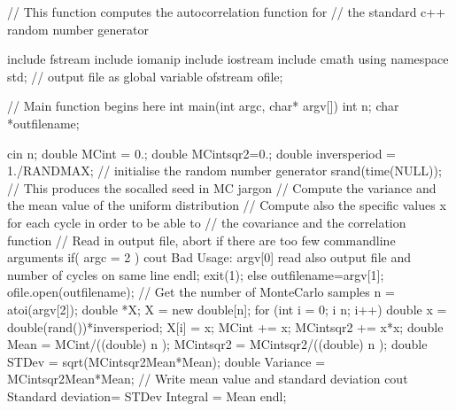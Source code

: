 \documentclass[letterpaper,10pt,english]{sphinxmanual}
\begin{document}
\begin{sphinxVerbatim}[commandchars=\\\{\}]
    //  This function computes the autocorrelation function for 
    //  the standard c++ random number generator
    
    \PYGZsh{}include \PYGZlt{}fstream\PYGZgt{}
    \PYGZsh{}include \PYGZlt{}iomanip\PYGZgt{}
    \PYGZsh{}include \PYGZlt{}iostream\PYGZgt{}
    \PYGZsh{}include \PYGZlt{}cmath\PYGZgt{}
    using namespace std;
    // output file as global variable
    ofstream ofile;  
    
    //     Main function begins here     
    int main(int argc, char* argv[])
    \PYGZob{}
         int n;
         char *outfilename;
    
         cin \PYGZgt{}\PYGZgt{} n;
         double MCint = 0.;      double MCintsqr2=0.;
         double invers\PYGZus{}period = 1./RAND\PYGZus{}MAX; // initialise the random number generator
         srand(time(NULL));  // This produces the so\PYGZhy{}called seed in MC jargon
         // Compute the variance and the mean value of the uniform distribution
         // Compute also the specific values x for each cycle in order to be able to
         // the covariance and the correlation function  
         // Read in output file, abort if there are too few command\PYGZhy{}line arguments
         if( argc \PYGZlt{}= 2 )\PYGZob{}
           cout \PYGZlt{}\PYGZlt{} \PYGZdq{}Bad Usage: \PYGZdq{} \PYGZlt{}\PYGZlt{} argv[0] \PYGZlt{}\PYGZlt{} 
    	 \PYGZdq{} read also output file and number of cycles on same line\PYGZdq{} \PYGZlt{}\PYGZlt{} endl;
           exit(1);
         \PYGZcb{}
         else\PYGZob{}
           outfilename=argv[1];
         \PYGZcb{}
         ofile.open(outfilename); 
         // Get  the number of Monte\PYGZhy{}Carlo samples
         n = atoi(argv[2]);
         double *X;  
         X = new double[n];
         for (int i = 0;  i \PYGZlt{} n; i++)\PYGZob{}
               double x = double(rand())*invers\PYGZus{}period; 
               X[i] = x;
               MCint += x;
               MCintsqr2 += x*x;
         \PYGZcb{}
         double Mean = MCint/((double) n );
         MCintsqr2 = MCintsqr2/((double) n );
         double STDev = sqrt(MCintsqr2\PYGZhy{}Mean*Mean);
         double Variance = MCintsqr2\PYGZhy{}Mean*Mean;
    //   Write mean value and standard deviation 
         cout \PYGZlt{}\PYGZlt{} \PYGZdq{} Standard deviation= \PYGZdq{} \PYGZlt{}\PYGZlt{} STDev \PYGZlt{}\PYGZlt{} \PYGZdq{} Integral = \PYGZdq{} \PYGZlt{}\PYGZlt{} Mean \PYGZlt{}\PYGZlt{} endl;
    

\end{sphinxVerbatim}
\end{document}
